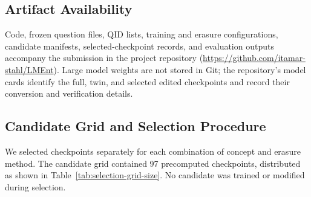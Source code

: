\begin{table}[h]
  \centering
  \scriptsize
  \caption{Complete candidate grid. Cartesian products are taken within each
  row. EMBER's $\delta$ is edit strength; RMU's $\alpha$ weights retention.}
  \label{tab:hyperparameter-grid}
\end{table}

\subsection{Artifact Availability}

Code, frozen question files, QID lists, training and erasure configurations,
candidate manifests, selected-checkpoint records, and evaluation outputs
accompany the submission in the project repository
(\url{https://github.com/itamar-stahl/LMEnt}). Large model weights are not
stored in Git; the repository's model cards identify the full, twin, and
selected edited checkpoints and record their conversion and verification
details.

\subsection{Candidate Grid and Selection Procedure}

We selected checkpoints separately for each combination of concept and
erasure method. The candidate grid contained 97 precomputed checkpoints,
distributed as shown in Table~\ref{tab:selection-grid-size}. No candidate was
trained or modified during selection.

